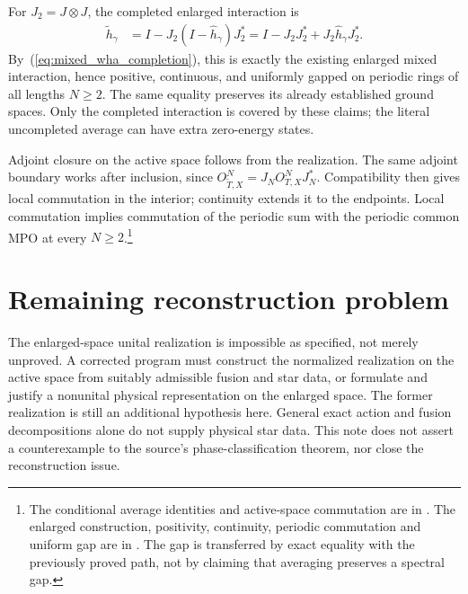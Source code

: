 \documentclass{article}
\begin{document}
For $J_2=J\otimes J$, the completed enlarged interaction is
\begin{align}
    \widetilde h_\gamma
     & =I-J_2(I-\widehat h_\gamma)J_2^*
    =I-J_2J_2^*+J_2\widehat h_\gamma J_2^*.
    \label{eq:mixed_wha_enlargement}
\end{align}
By~(\ref{eq:mixed_wha_completion}), this is exactly the existing enlarged
mixed interaction, hence positive, continuous, and uniformly gapped on
periodic rings of all lengths $N\ge2$. The same equality preserves its
already established ground spaces. Only the completed interaction is
covered by these claims; the literal uncompleted average can have extra
zero-energy states.

Adjoint closure on the active space follows from the realization.
The same adjoint boundary works after inclusion, since
$O_{\widetilde T,X}^N=J_N O_{T,X}^N J_N^*$.
Compatibility then gives local commutation in the interior; continuity
extends it to the endpoints. Local commutation implies commutation of the
periodic sum with the periodic common MPO at every $N\ge2$.\footnote{
    The conditional average identities and active-space commutation are in
    .
    The enlarged construction, positivity, continuity, periodic commutation and
    uniform gap are in
    .
    The gap is transferred by exact equality with the previously proved path,
    not by claiming that averaging preserves a spectral gap.}

\section{Remaining reconstruction problem}
The enlarged-space unital realization is impossible as specified, not
merely unproved. A corrected program must construct the normalized
realization on the active space from suitably admissible fusion and
star data, or formulate and justify a nonunital physical representation
on the enlarged space. The former realization is still an additional
hypothesis here. General exact action and fusion decompositions alone
do not supply physical star data. This note does not assert a
counterexample to the source's phase-classification theorem, nor close
the reconstruction issue.


\end{document}

